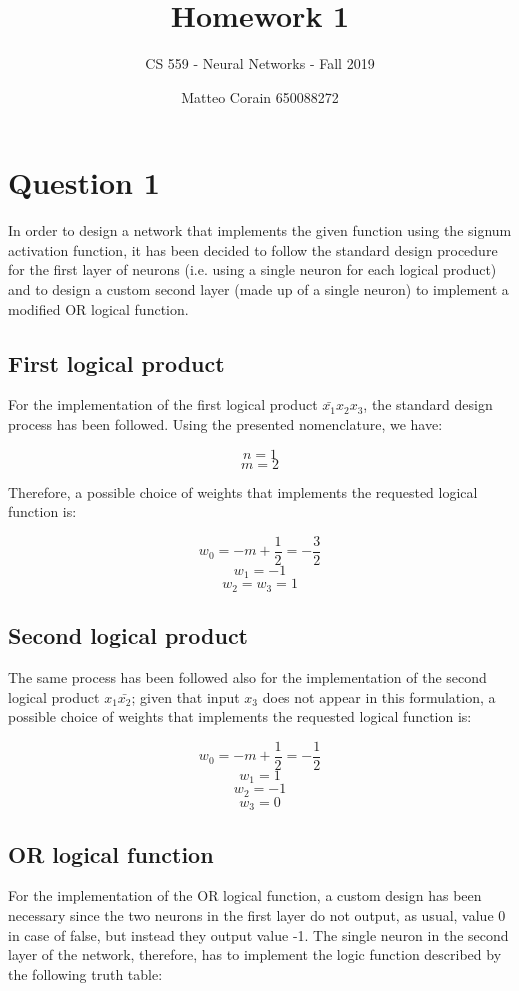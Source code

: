 \documentclass[letterpaper,headings=standardclasses]{scrartcl}
\title{Homework 1}
\subtitle{CS 559 - Neural Networks - Fall 2019}
\author{Matteo Corain 650088272}
\begin{document}
\maketitle

\section{Question 1}

In order to design a network that implements the given function using the signum activation function, it has been decided to follow the standard design procedure for the first layer of neurons (i.e. using a single neuron for each logical product) and to design a custom second layer (made up of a single neuron) to implement a modified OR logical function.

\subsection{First logical product}

For the implementation of the first logical product $\bar{x_1} x_2 x_3$, the standard design process has been followed. Using the presented nomenclature, we have:

$$ n = 1 $$
$$ m = 2 $$

Therefore, a possible choice of weights that implements the requested logical function is:

$$ w_0 = -m + \frac{1}{2} = -\frac{3}{2} $$
$$ w_1 = -1 $$
$$ w_2 = w_3 = 1 $$

\subsection{Second logical product}

The same process has been followed also for the implementation of the second logical product $ x_1 \bar{x_2} $; given that input $x_3$ does not appear in this formulation, a possible choice of weights that implements the requested logical function is:

$$ w_0 = -m + \frac{1}{2} = -\frac{1}{2} $$
$$ w_1 = 1 $$
$$ w_2 = -1 $$
$$ w_3 = 0 $$

\subsection{OR logical function}

For the implementation of the OR logical function, a custom design has been necessary since the two neurons in the first layer do not output, as usual, value 0 in case of false, but instead they output value -1. The single neuron in the second layer of the network, therefore, has to implement the logic function described by the following truth table:
\end{document}
